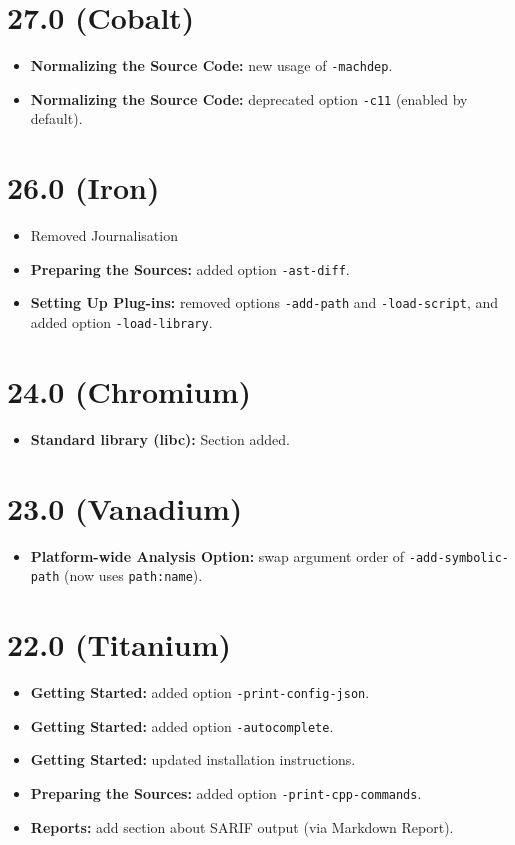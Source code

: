 \section*{27.0 (Cobalt)}
\begin{itemize}
\item \textbf{Normalizing the Source Code:} new usage of \texttt{-machdep}.
\item \textbf{Normalizing the Source Code:} deprecated option \texttt{-c11}
  (enabled by default).
\end{itemize}

\section*{26.0 (Iron)}
\begin{itemize}
\item Removed Journalisation
\item \textbf{Preparing the Sources:} added option \texttt{-ast-diff}.
\item \textbf{Setting Up Plug-ins:} removed options \texttt{-add-path} and
  \texttt{-load-script}, and added option \texttt{-load-library}.
\end{itemize}

\section*{24.0 (Chromium)}
\begin{itemize}
\item \textbf{Standard library (libc):} Section added.
\end{itemize}

\section*{23.0 (Vanadium)}

\begin{itemize}
\item \textbf{Platform-wide Analysis Option:} swap argument order of
  \texttt{-add-symbolic-path} (now uses \texttt{path:name}).
\end{itemize}

\section*{22.0 (Titanium)}

\begin{itemize}
\item \textbf{Getting Started:} added option
  \texttt{-print-config-json}.
\item \textbf{Getting Started:} added option
  \texttt{-autocomplete}.
\item \textbf{Getting Started:} updated installation instructions.
\item \textbf{Preparing the Sources:} added option
  \texttt{-print-cpp-commands}.
\item \textbf{Reports:} add section about SARIF output
  (via \textsf{Markdown Report}).
\end{itemize}


